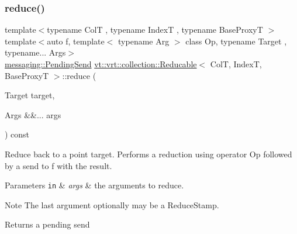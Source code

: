 \subsubsection{\texorpdfstring{reduce()}{reduce()}\hspace{0.1cm}{\footnotesize\ttfamily [1/8]}}
{\footnotesize\ttfamily template$<$typename ColT , typename IndexT , typename Base\+ProxyT $>$ \\
template$<$auto f, template$<$ typename Arg $>$ class Op, typename Target , typename... Args$>$ \\
\hyperlink{structvt_1_1messaging_1_1_pending_send}{messaging\+::\+Pending\+Send} \hyperlink{structvt_1_1vrt_1_1collection_1_1_reducable}{vt\+::vrt\+::collection\+::\+Reducable}$<$ ColT, IndexT, Base\+ProxyT $>$\+::reduce (\begin{DoxyParamCaption}\item[{Target}]{target,  }\item[{Args \&\&...}]{args }\end{DoxyParamCaption}) const}



Reduce back to a point target. Performs a reduction using operator {\ttfamily Op} followed by a send to {\ttfamily f} with the result. 


\begin{DoxyParams}[1]{Parameters}
\mbox{\tt in}  & {\em args} & the arguments to reduce. \\
\hline
\end{DoxyParams}
\begin{DoxyNote}{Note}
The last argument optionally may be a {\ttfamily Reduce\+Stamp}.
\end{DoxyNote}
\begin{DoxyReturn}{Returns}
a pending send 
\end{DoxyReturn}
\mbox{\label{structvt_1_1vrt_1_1collection_1_1_reducable_a9e1ce747f05b89cddb6d7306e2339fc1}} 
